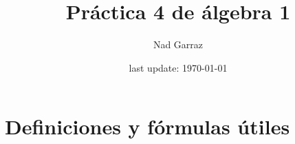 

\usepackage{polynom} %





\pagestyle{empty} %

\title{Práctica 4 de álgebra 1} %
\author{Nad Garraz} %
\date{last update: \today} %

\maketitle  %
\section{Definiciones y fórmulas útiles}

